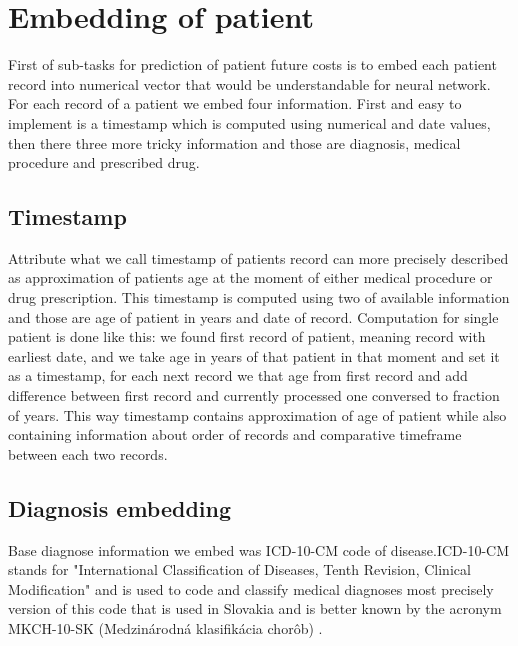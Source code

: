 
\section{Embedding of patient}
\label{embedding}

First of sub-tasks for prediction of patient future costs is to embed each patient record into numerical vector that would be understandable for neural network. For each record of a patient we embed four information. First and easy to implement is a timestamp which is computed using numerical and date values, then there three more tricky information and those are diagnosis, medical procedure and prescribed drug. 

\subsection{Timestamp}

Attribute what we call timestamp of patients record can more precisely described as approximation of patients age at the moment of either medical procedure or drug prescription. This timestamp is computed using two of available information and those are age of patient in years and date of record. Computation for single patient is done like this: we found first record of patient, meaning record with earliest date, and we take age in years of that patient in that moment and set it as a timestamp, for each next record we that age from first record and add difference between first record and currently processed one conversed to fraction of years. This way timestamp contains approximation of age of patient while also containing information about order of records and comparative timeframe between each two records.

\subsection{Diagnosis embedding}
\label{diagEmb}

Base diagnose information we embed was ICD-10-CM code of disease.ICD-10-CM stands for "International Classification of Diseases, Tenth Revision, Clinical Modification" and is used to code and classify medical diagnoses \cite{cdcICD10CM} most precisely version of this code that is used in Slovakia and is better known by the acronym MKCH-10-SK (Medzinárodná klasifikácia chorôb) \cite{ncziMKCH}.\\

